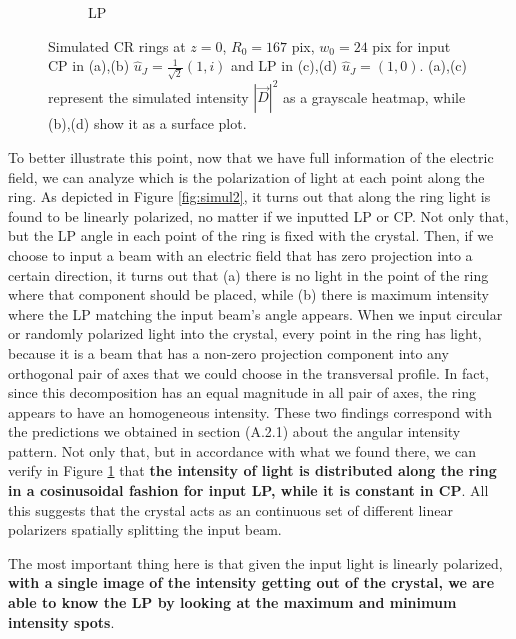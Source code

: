 \documentclass[11pt, a4paper, twoside]{article} %
\begin{document}
\begin{figure}[h!]
\begin{subfigure}[b]{0.25\linewidth}
     \caption{LP }
     \end{subfigure}
    \caption{Simulated CR rings at $z=0$, $R_0=167$ pix, $w_0=24$ pix for input CP in (a),(b) $\hat{u}_J=\frac{1}{\sqrt{2}}(1,i)$ and LP in (c),(d) $\hat{u}_J=(1,0)$. (a),(c) represent the simulated intensity $|\vec{D}|^2$ as a grayscale heatmap, while (b),(d) show it as a surface plot.\vspace{-0.2cm}}
        \label{fig:simul1}
\end{figure}

To better illustrate this point, now that we have full information of the electric field, we can analyze which is the polarization of light at each point along the ring. As depicted in Figure \ref{fig:simul2}, it turns out that along the ring light is found to be linearly polarized, no matter if we inputted LP or CP. Not only that, but the LP angle in each point of the ring is fixed with the crystal. Then, if we choose to input a beam with an electric field that has zero projection into a certain direction, it turns out that (a) there is no light in the point of the ring where that component should be placed, while (b) there is maximum intensity where the LP matching the input beam's angle appears. When we input circular or randomly polarized light into the crystal, every point in the ring has light, because it is a beam that has a non-zero projection component into any orthogonal pair of axes that we could choose in the transversal profile. In fact, since this decomposition has an equal magnitude in all pair of axes, the ring appears to have an homogeneous intensity. These two findings correspond with the predictions we obtained in section (A.2.1) about the angular intensity pattern. Not only that, but in accordance with what we found there, we can verify in Figure \ref{fig:simul1} that {\bf the intensity of light is distributed along the ring in a cosinusoidal fashion for input LP, while it is constant in CP}. All this suggests that the crystal acts as an continuous set of different linear polarizers spatially splitting the input beam.

The most important thing here is that given the input light is linearly polarized, {\bf with a single image of the intensity getting out of the crystal, we are able to know the LP by looking at the maximum and minimum intensity spots}.
\end{document}
